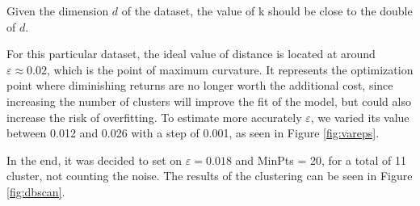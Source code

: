 \documentclass[a4paper,11pt,dvipsnames]{article}
\begin{document}
Given the dimension $d$ of the dataset, the value of k should be close to the double of $d$\cite{Sander1998}. 

For this particular dataset, the ideal value of distance is located at around $\varepsilon\approx 0.02$, which is the point of maximum curvature. It represents the optimization point where diminishing returns are no longer worth the additional cost, since increasing the number of clusters will improve the fit of the model, but could also increase the risk of overfitting. To estimate more accurately $\varepsilon$, we varied its value between 0.012 and 0.026 with a step of 0.001, as seen in Figure \ref{fig:vareps}. 

In the end, it was decided to set on $\varepsilon= 0.018$ and MinPts = 20, for a total of 11 cluster, not counting the noise. The results of the clustering can be seen in Figure \ref{fig:dbscan}.

\end{document}
